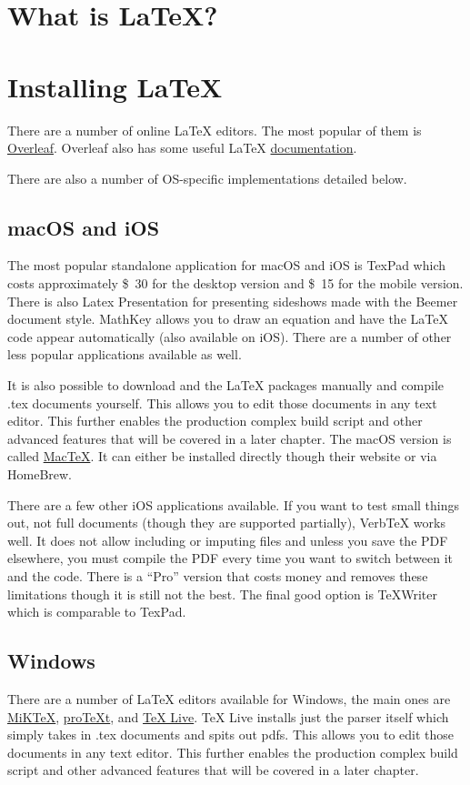\section{What is \LaTeX?}

\section{Installing \LaTeX}
There are a number of online \LaTeX{} editors. The most popular of them is \href{https://www.overleaf.com}{Overleaf}. Overleaf also has some useful \LaTeX{} \href{https://www.overleaf.com/learn}{documentation}.\par
There are also a number of OS-specific implementations detailed below.

\subsection{macOS and iOS}
The most popular standalone application for macOS and iOS is TexPad which costs approximately \SI{30}[\$]{} for the desktop version and \SI{15}[\$]{} for the mobile version. There is also Latex Presentation for presenting sideshows made with the Beemer document style. MathKey allows you to draw an equation and have the \LaTeX{} code appear automatically (also available on iOS). There are a number of other less popular applications available as well.\par
It is also possible to download and the \LaTeX{} packages manually and compile .tex documents yourself. This allows you to edit those documents in any text editor. This further enables the production complex build script and other advanced features that will be covered in a later chapter. The macOS version is called \href{http://www.tug.org/mactex/}{MacTeX}. It can either be installed directly though their website or via HomeBrew.\par
There are a few other iOS applications available. If you want to test small things out, not full documents (though they are supported partially), VerbTeX works well. It does not allow including or imputing files and unless you save the PDF elsewhere, you must compile the PDF every time you want to switch between it and the code. There is a ``Pro'' version that costs money and removes these limitations though it is still not the best. The final good option is TeXWriter which is comparable to TexPad.

\subsection{Windows}
There are a number of \LaTeX{} editors available for Windows, the main ones are \href{https://miktex.org/}{MiKTeX}, \href{http://www.tug.org/protext/}{proTeXt}, and \href{http://www.tug.org/texlive/}{TeX Live}. TeX Live installs just the parser itself which simply takes in .tex documents and spits out pdfs. This allows you to edit those documents in any text editor. This further enables the production complex build script and other advanced features that will be covered in a later chapter.

